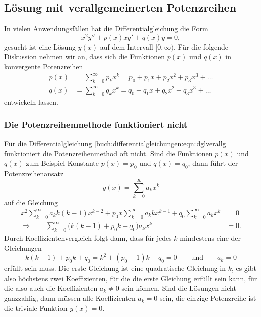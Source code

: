%
%
\subsection{Lösung mit verallgemeinerten Potenzreihen
\label{buch:differentialgleichungen:subsection:verallgemeinrt}}
In vielen Anwendungsfällen hat die Differentialgleichung die Form
\begin{equation}
x^2y'' + p(x)xy' + q(x)y = 0,
\label{buch:differentialgleichungen:eqn:dglverallg}
\end{equation}
gesucht ist eine Lösung $y(x)$ auf dem Intervall $[0,\infty)$.
Für die folgende Diskussion nehmen wir an, dass sich die Funktionen
$p(x)$ und $q(x)$ in konvergente Potenzreihen
\begin{align*}
p(x)&=\sum_{k=0}^\infty p_kx^k = p_0+p_1x+p_2x^2+p_3x^3+\dots
\\
q(x)&=\sum_{k=0}^\infty q_kx^k = q_0+q_1x+q_2x^2+q_3x^3+\dots
\end{align*}
entwickeln lassen.

%
%
\subsubsection{Die Potenzreihenmethode funktioniert nicht}
Für die Differentialgleichung
\eqref{buch:differentialgleichungen:eqn:dglverallg}
funktioniert die Potenzreihenmethod oft nicht.
Sind die Funktionen $p(x)$ und $q(x)$ zum Beispiel Konstante 
$p(x)=p_0$ und $q(x)=q_0$, dann führt der Potenzreihenansatz
\[
y(x) = \sum_{k=0}^\infty a_kx^k
\]
auf die Gleichung
\begin{align*}
x^2\sum_{k=0}^\infty a_kk(k-1)x^{k-2}
+
p_0x\sum_{k=0}^\infty a_kkx^{k-1}
+
q_0\sum_{k=0}^\infty a_kx^k
&=
0
\\
\Rightarrow\qquad
\sum_{k=0}^\infty\bigl(
k(k-1)
+
p_0k
+
q_0
\bigr)a_kx^k
&=
0.
\end{align*}
Durch Koeffizientenvergleich folgt dann, dass für jedes $k$ mindestens
eine der Gleichungen
\[
k(k-1) +p_0k +q_0 = k^2 + (p_0-1)k +q_0 = 0
\qquad\text{und}\qquad
a_k=0
\]
erfüllt sein muss.
Die erste Gleichung ist eine quadratische Gleichung in $k$, es gibt also
höchstens zwei Koeffizienten, für die die erste Gleichung erfüllt sein
kann, für die also auch die Koeffizienten $a_k\ne 0$ sein können.
Sind die Lösungen nicht ganzzahlig, dann müssen alle Koeffizienten 
$a_k=0$ sein, die einzige Potenzreihe ist die triviale Funktion $y(x)=0$.

%
%
